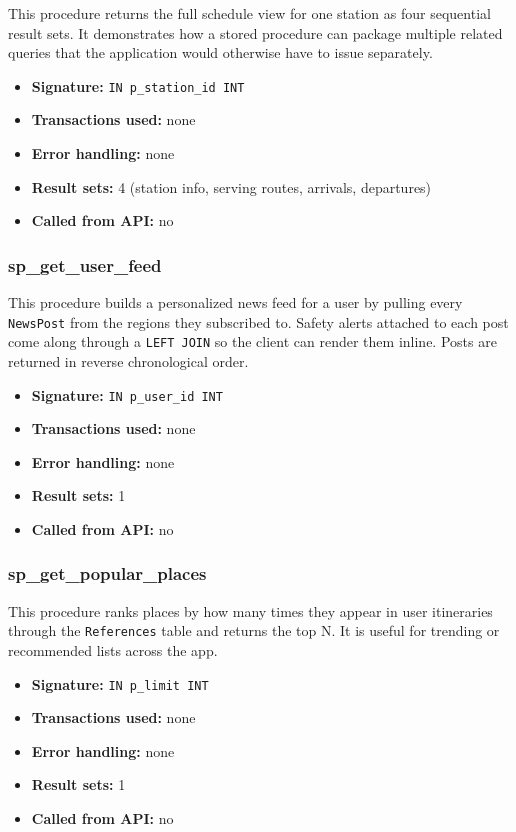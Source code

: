This procedure returns the full schedule view for one station as four sequential result sets. It demonstrates how a stored procedure can package multiple related queries that the application would otherwise have to issue separately.

\begin{itemize}
    \item \textbf{Signature:} \texttt{IN p\_station\_id INT}
    \item \textbf{Transactions used:} none
    \item \textbf{Error handling:} none
    \item \textbf{Result sets:} 4 (station info, serving routes, arrivals, departures)
    \item \textbf{Called from API:} no
\end{itemize}

\subsubsection{sp\_get\_user\_feed}

This procedure builds a personalized news feed for a user by pulling every \texttt{NewsPost} from the regions they subscribed to. Safety alerts attached to each post come along through a \texttt{LEFT JOIN} so the client can render them inline. Posts are returned in reverse chronological order.

\begin{itemize}
    \item \textbf{Signature:} \texttt{IN p\_user\_id INT}
    \item \textbf{Transactions used:} none
    \item \textbf{Error handling:} none
    \item \textbf{Result sets:} 1
    \item \textbf{Called from API:} no
\end{itemize}

\subsubsection{sp\_get\_popular\_places}

This procedure ranks places by how many times they appear in user itineraries through the \texttt{References} table and returns the top N. It is useful for trending or recommended lists across the app.

\begin{itemize}
    \item \textbf{Signature:} \texttt{IN p\_limit INT}
    \item \textbf{Transactions used:} none
    \item \textbf{Error handling:} none
    \item \textbf{Result sets:} 1
    \item \textbf{Called from API:} no
\end{itemize}

